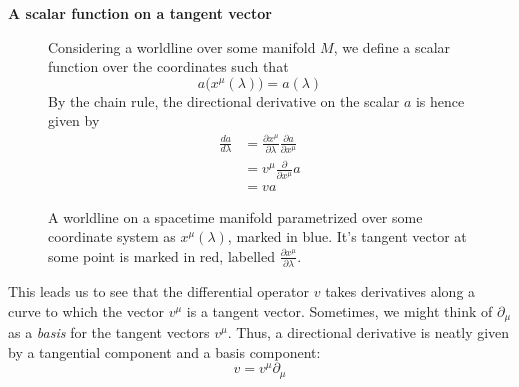 \documentclass{article}
\begin{document}
 			\begin{exmp}
 				\textbf{A scalar function on a tangent vector}
 				\begin{figure}[h]
 					\begin{minipage}{0.4\textwidth}
 						\center
 						\caption{A worldline on a spacetime manifold parametrized over some coordinate system as $x^{\mu} (\lambda)$, marked in blue. It's tangent vector at some point is marked in red, labelled $\frac{\partial x^\mu}{\partial \lambda}$.}
 					\end{minipage}
 					\begin{minipage}{0.56\textwidth}
 						\begin{spacing}{1.5}
 							Considering a worldline over some manifold $M$, we define a scalar function over the coordinates such that
 							$$ a\big(x^\mu (\lambda)\big) = a(\lambda)$$
 							By the chain rule, the directional derivative on the scalar $a$ is hence given by
 							\vspace{0cm}
 							\begin{align*}
 								\frac{da}{d\lambda} &= \frac{\partial x^\mu}{\partial \lambda} \frac{\partial a}{\partial x^\mu} \\
 								&= v^\mu \frac{\partial}{\partial x^\mu} a \\
 								&=v a
 							\end{align*}
 						\end{spacing}
 					\end{minipage}
 				\end{figure}
 			
 				\vspace{-0.5cm}\noindent
 				This leads us to see that the differential operator $v$ takes derivatives along a curve to which the vector $v^\mu$ is a tangent vector. Sometimes, we might think of $\partial_\mu$ as a \textit{basis} for the tangent vectors $v^\mu$. Thus, a directional derivative is neatly given by a tangential component and a basis component:
 				$$ v = v^\mu \partial_\mu$$
 			\end{exmp}
\end{document}
